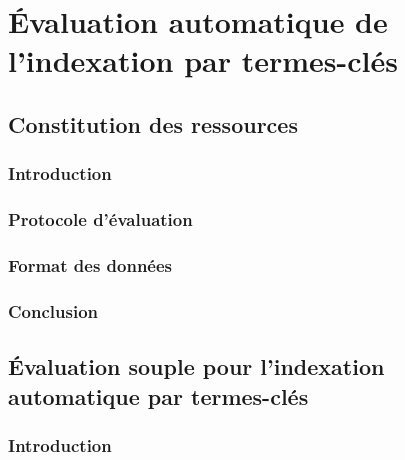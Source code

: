 \part{Évaluation automatique de l'indexation par termes-clés}
\label{part:main-automatic_evaluation_of_keyphrase_annotation}


  \chapter{Constitution des ressources}
  \label{chap:main-automatic_evaluation_of_keyphrase_annotation-resource_construction}
    \section{Introduction}
    \label{sec:main-automatic_evaluation_of_keyphrase_annotation-resource_construction-introduction}

    \section{Protocole d'évaluation}
    \label{sec:main-automatic_evaluation_of_keyphrase_annotation-resource_construction-evaluation_protocol}

    \section{Format des données}
    \label{sec:main-automatic_evaluation_of_keyphrase_annotation-resource_construction-data_format}

    \section{Conclusion}
    \label{sec:main-automatic_evaluation_of_keyphrase_annotation-resource_construction-conclusion}


  \chapter{Évaluation souple pour l'indexation automatique par termes-clés}
  \label{chap:main-automatic_evaluation_of_keyphrase_annotation-evaluation}
    \section{Introduction}
    \label{sec:main-automatic_evaluation_of_keyphrase_annotation-contributions-evaluation-introduction}

